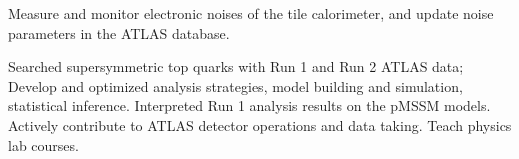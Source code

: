 \begin{cventries}
\end{cventries}
    \vspace{-1cm}
    \parbox{0.9\linewidth}{
      \leftskip=0.5in
        Measure and monitor electronic noises of the tile calorimeter, and update noise parameters in the  ATLAS database.
    }
\begin{cventries}
\end{cventries}
    \vspace{-1cm}
     \parbox{0.9\linewidth}{
      \leftskip=0.5in
        Searched supersymmetric top quarks with Run 1 and Run 2 ATLAS data; Develop and optimized analysis strategies, model building and simulation, statistical inference. \newline 
        Interpreted Run 1 analysis results on the pMSSM models. \newline
        Actively contribute to ATLAS detector operations and data taking. \newline
        Teach physics lab courses.
      }
